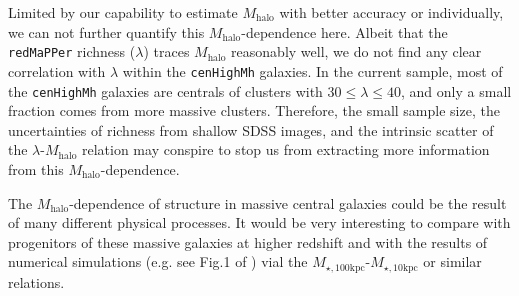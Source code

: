 \documentclass{emulateapj}
\def\redm{\texttt{redMaPPer}}
\def\rbcg{\texttt{cenHighMh}}
\def\mhalo{{$M_{\mathrm{halo}}$}}
\def\minn{{$M_{\star,10\mathrm{kpc}}$}}
\def\mtot{{$M_{\star,100\mathrm{kpc}}$}}
\begin{document}
\begin{CJK*}{UTF8}{gbsn}
    Limited by our capability to estimate \mhalo{} with better accuracy or individually, 
    we can not further quantify this \mhalo{}-dependence here.
    Albeit that the \redm{} richness ($\lambda$) traces \mhalo{} reasonably well, 
    we do not find any clear correlation with $\lambda$ within the \rbcg{} galaxies.
    In the current sample, most of the \rbcg{} galaxies are centrals of clusters with 
    $30 \leq \lambda \leq 40$, and only a small fraction comes from more massive clusters.  
    Therefore, the small sample size, the uncertainties of richness from shallow SDSS
    images, and the intrinsic scatter of the $\lambda$-\mhalo{} relation may conspire to 
    stop us from extracting more information from this \mhalo{}-dependence.
    
    The \mhalo{}-dependence of structure in massive central galaxies could be the result 
    of many different physical processes. 
    It would be very interesting to compare with progenitors of these massive 
    galaxies at higher redshift and with the results of numerical simulations (e.g. see 
    Fig.1 of \citealt{Wellons2016b}) vial the \mtot{}-\minn{} or similar relations.


\end{CJK*}
\end{document}
